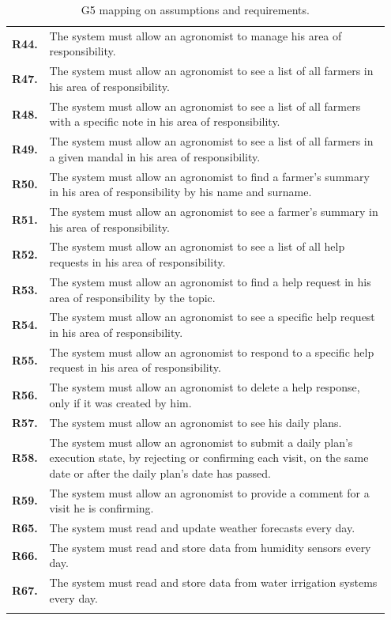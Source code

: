 \begin{longtable}{p{0.07\linewidth} p{0.88\linewidth}}
	\textbf{R44.} & The system must allow an agronomist to manage his area of responsibility.\\
	\textbf{R47.} & The system must allow an agronomist to see a list of all farmers in his area of responsibility.\\
	\textbf{R48.} & The system must allow an agronomist to see a list of all farmers with a specific note in his area of responsibility.\\
	\textbf{R49.} & The system must allow an agronomist to see a list of all farmers in a given mandal in his area of responsibility.\\
	\textbf{R50.} & The system must allow an agronomist to find a farmer's summary in his area of responsibility by his name and surname.\\
	\textbf{R51.} & The system must allow an agronomist to see a farmer's summary in his area of responsibility.\\
	\textbf{R52.} & The system must allow an agronomist to see a list of all help requests in his area of responsibility.\\
	\textbf{R53.} & The system must allow an agronomist to find a help request in his area of responsibility by the topic.\\
	\textbf{R54.} & The system must allow an agronomist to see a specific help request in his area of responsibility.\\
	\textbf{R55.} & The system must allow an agronomist to respond to a specific help request in his area of responsibility.\\
	\textbf{R56.} & The system must allow an agronomist to delete a help response, only if it was created by him.\\
	\textbf{R57.} & The system must allow an agronomist to see his daily plans.\\
	\textbf{R58.} & The system must allow an agronomist to submit a daily plan's execution state, by rejecting or confirming each visit, on the same date or after the daily plan's date has passed. \\
	\textbf{R59.} & The system must allow an agronomist to provide a comment for a visit he is confirming.\\

	\textbf{R65.} & The system must read and update weather forecasts every day. \\
	\textbf{R66.} & The system must read and store data from humidity sensors every day. \\
	\textbf{R67.} & The system must read and store data from water irrigation systems every day. \\
    \bottomrule
    \caption{G5 mapping on assumptions and requirements.}
\end{longtable}

